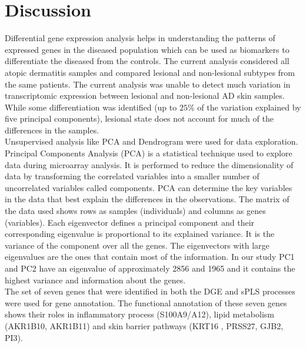 \documentclass[journal, a4paper]{IEEEtran}
\begin{document}

\section{Discussion}

Differential gene expression analysis helps in understanding the patterns of expressed genes in the diseased population which can be used as biomarkers to differentiate the diseased from the controls. The current analysis considered all atopic dermatitis samples and compared lesional and non-lesional subtypes from the same patients. The current analysis was unable to detect much variation in transcriptomic expression between lesional and non-lesional AD skin samples. While some differentiation was identified (up to $25\%$ of the variation explained by five principal components), lesional state does not account for much of the differences in the samples.\\

Unsupervised analysis like PCA and Dendrogram	 were used for data exploration. Principal Components Analysis (PCA) is a statistical technique used to explore data during microarray analysis. It is performed to reduce the dimensionality of data by transforming the correlated variables into a smaller number of uncorrelated variables called components. PCA can determine the key variables in the data that best explain the differences in the observations. The matrix of the data used shows rows as samples (individuals) and columns as genes (variables). Each eigenvector defines a principal component and their corresponding eigenvalue is proportional to its explained variance. It is the variance of the component over all the genes. The eigenvectors with large eigenvalues are the ones that contain most of the information. In our study PC1 and PC2 have an eigenvalue of approximately 2856 and 1965 and it contains the highest variance and information about the genes.\\

The set of seven genes that were identified in both the DGE and sPLS processes were used for gene annotation. The functional annotation of these seven genes shows their roles in inflammatory process (S100A9/A12), lipid metabolism (AKR1B10, AKR1B11) and skin barrier pathways (KRT16 , PRSS27, GJB2, PI3).
\end{document}
